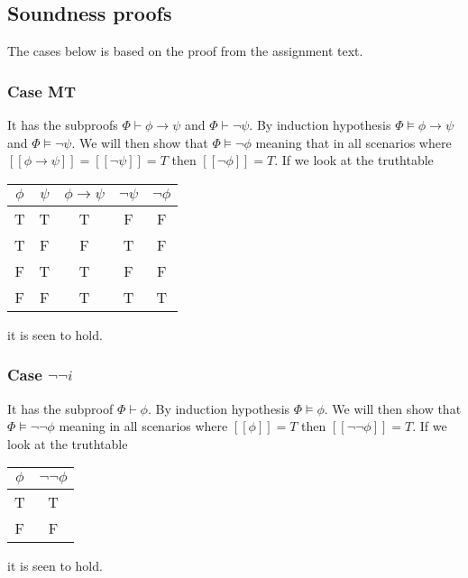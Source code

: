 \documentclass[12pt]{article}
\let\imp\to
\begin{document}
\subsection*{Soundness proofs}
The cases below is based on the proof from the assignment text.
\subsubsection*{Case MT}
It has the subproofs $\Phi\vdash\phi\imp\psi$ and $\Phi\vdash\neg\psi$. By induction hypothesis $\Phi\models\phi\imp\psi$ and $\Phi\models\neg\psi$. We will then show that $\Phi\models\neg\phi$ meaning that in all scenarios where $[[\phi\imp\psi]]=[[\neg \psi]]=T$ then $[[\neg\phi]]=T$. If we look at the truthtable
\begin{center}
\begin{tabular}{|c|c||c|c||c|}
\hline 
$\phi$ & $\psi$ & $\phi\imp\psi$ & $\neg\psi$ & $\neg\phi$ \\ 
\hline 
T & T & T & F & F \\ 
\hline 
T & F & F & T & F\\ 
\hline
F & T & T & F & F\\ 
\hline
F & F & T & T & T\\ 
\hline
\end{tabular} 
\end{center}
it is seen to hold.

\subsubsection*{Case $\neg\neg i$}
It has the subproof $\Phi\vdash\phi$. By induction hypothesis $\Phi\models\phi$. We will then show that $\Phi\models\neg\neg\phi$ meaning in all scenarios where $[[\phi]]=T$ then $[[\neg\neg \phi]]=T$. If we look at the truthtable\\
\begin{center}
\begin{tabular}{|c||c|}
\hline 
$\phi$ & $\neg\neg\phi$ \\ 
\hline 
T & T \\ 
\hline 
F & F \\ 
\hline 
\end{tabular} 
\end{center}
it is seen to hold.
\end{document}
